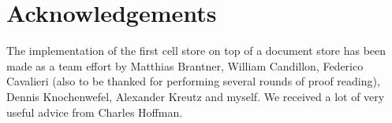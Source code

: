 \documentclass{acm_proc_article-sp}
\begin{document}
\section{Acknowledgements}

The implementation of the first cell store on top of a document store has been made as a team effort by Matthias Brantner, William Candillon, Federico Cavalieri (also to be thanked for performing several rounds of proof reading), Dennis Knochenwefel, Alexander Kreutz and myself. We received a lot of very useful advice from Charles Hoffman.



\end{document}
